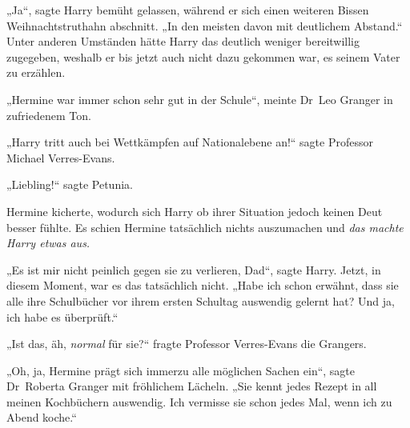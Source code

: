 „Ja“, sagte Harry bemüht gelassen, während er sich einen weiteren Bissen Weihnachtstruthahn abschnitt. „In den meisten davon mit deutlichem Abstand.“ Unter anderen Umständen hätte Harry das deutlich weniger bereitwillig zugegeben, weshalb er bis jetzt auch nicht dazu gekommen war, es seinem Vater zu erzählen.

„Hermine war immer schon sehr gut in der Schule“, meinte Dr~Leo Granger in zufriedenem Ton.

„Harry tritt auch bei Wettkämpfen auf Nationalebene an!“ sagte Professor Michael Verres-Evans.

„Liebling!“ sagte Petunia.

Hermine kicherte, wodurch sich Harry ob ihrer Situation jedoch keinen Deut besser fühlte. Es schien Hermine tatsächlich nichts auszumachen und \emph{das machte Harry etwas aus.}

„Es ist mir nicht peinlich gegen sie zu verlieren, Dad“, sagte Harry. Jetzt, in diesem Moment, war es das tatsächlich nicht. „Habe ich schon erwähnt, dass sie alle ihre Schulbücher vor ihrem ersten Schultag auswendig gelernt hat? Und ja, ich habe es überprüft.“

„Ist das, äh, \emph{normal} für sie?“ fragte Professor Verres-Evans die Grangers.

„Oh, ja, Hermine prägt sich immerzu alle möglichen Sachen ein“, sagte Dr~Roberta Granger mit fröhlichem Lächeln. „Sie kennt jedes Rezept in all meinen Kochbüchern auswendig. Ich vermisse sie schon jedes Mal, wenn ich zu Abend koche.“

